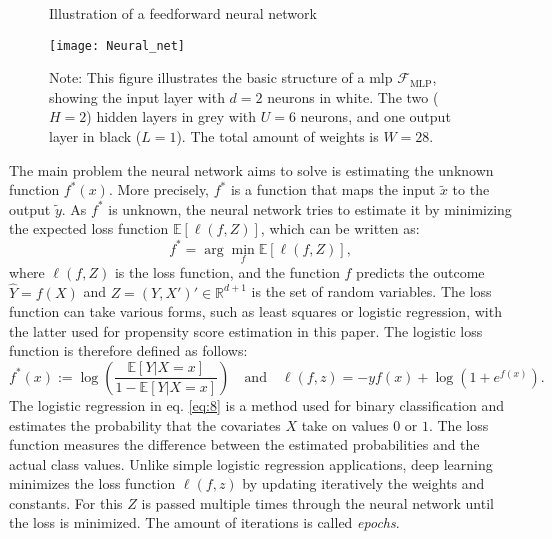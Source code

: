 \begin{figure}%
\centering
\caption{Illustration of a feedforward neural network \citep{farrellDeepNeuralNetworks2021}}
\texttt{[image: Neural\_net]}
\caption*{Note: This figure illustrates the basic structure of a \ac{mlp} $\mathcal{F}_{\text{MLP}}$, showing the input layer with $d=2$ neurons in white. The two ($H=2$) hidden layers in grey with $U=6$ neurons, and one output layer in black ($L=1$). The total amount of weights is $W=28$.}
\label{fig:1}
\end{figure}


The main problem the neural network aims to solve is estimating the unknown function $f^*(x)$.
More precisely, $f^*$ is a function that maps the input $\tilde{x}$ to the output $\tilde{y}$.
As $f^*$ is unknown, the neural network tries to estimate it by minimizing the expected loss function $\mathbb{E}[\ell(f, Z)]$, which can be written as:
\begin{equation}
f^* = \arg \min_f \mathbb{E}[\ell(f, Z)],
\end{equation}
where $\ell(f, Z)$ is the loss function, and the function $f$ predicts the outcome $\hat{Y} = f(X)$ and $Z = (Y, X')' \in \mathbb{R}^{d+1}$ is the set of random variables.
The loss function can take various forms, such as least squares or logistic regression, with the latter used for propensity score estimation in this paper.
The logistic loss function is therefore defined as follows:
\begin{equation}
f^*(x) := \log \left( \frac{\mathbb{E}[Y|X = x]}{1 - \mathbb{E}[Y|X = x]} \right) \quad \text{and} \quad \ell(f, z) = -yf(x) + \log(1 + e^{f(x)}).
\label{eq:8}
\end{equation}
The logistic regression in eq. \ref*{eq:8} is a method used for binary classification and estimates the probability that the covariates $X$ take on values $0$ or $1$.
The loss function measures the difference between the estimated probabilities and the actual class values.
Unlike simple logistic regression applications, deep learning minimizes the loss function $\ell(f, z)$ by updating iteratively the weights and constants.
For this $Z$ is passed multiple times through the neural network until the loss is minimized.
The amount of iterations is called \textit{epochs}.

